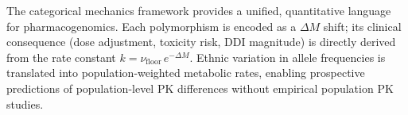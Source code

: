 \documentclass[11pt,twocolumn,a4paper]{article}
\begin{document}
The categorical mechanics framework provides a unified, quantitative language
for pharmacogenomics.  Each polymorphism is encoded as a $\Delta M$ shift;
its clinical consequence (dose adjustment, toxicity risk, DDI magnitude) is
directly derived from the rate constant $k = \nu_\text{floor}\,e^{-\Delta M}$.
Ethnic variation in allele frequencies is translated into population-weighted
metabolic rates, enabling prospective predictions of population-level PK
differences without empirical population PK studies.



\end{document}
